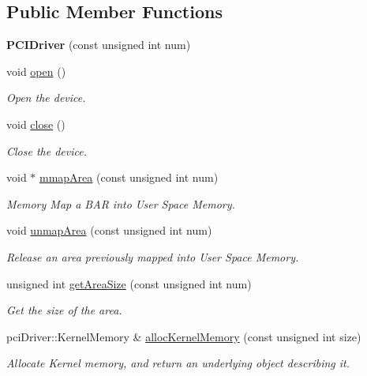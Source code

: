 \subsection*{Public Member Functions}
\begin{CompactItemize}
\item 
\hypertarget{classmprace_1_1PCIDriver_a0}{
{\bf PCIDriver} (const unsigned int num)}
\label{classmprace_1_1PCIDriver_a0}

\item 
void \hyperlink{classmprace_1_1PCIDriver_a2}{open} ()
\begin{CompactList}\small\item\em Open the device. \item\end{CompactList}\item 
void \hyperlink{classmprace_1_1PCIDriver_a3}{close} ()
\begin{CompactList}\small\item\em Close the device. \item\end{CompactList}\item 
void $\ast$ \hyperlink{classmprace_1_1PCIDriver_a4}{mmap\-Area} (const unsigned int num)
\begin{CompactList}\small\item\em Memory Map a BAR into User Space Memory. \item\end{CompactList}\item 
void \hyperlink{classmprace_1_1PCIDriver_a5}{unmap\-Area} (const unsigned int num)
\begin{CompactList}\small\item\em Release an area previously mapped into User Space Memory. \item\end{CompactList}\item 
unsigned int \hyperlink{classmprace_1_1PCIDriver_a6}{get\-Area\-Size} (const unsigned int num)
\begin{CompactList}\small\item\em Get the size of the area. \item\end{CompactList}\item 
pci\-Driver::Kernel\-Memory \& \hyperlink{classmprace_1_1PCIDriver_a7}{alloc\-Kernel\-Memory} (const unsigned int size)
\begin{CompactList}\small\item\em Allocate Kernel memory, and return an underlying object describing it. \item\end{CompactList}\item 

\end{CompactItemize}
